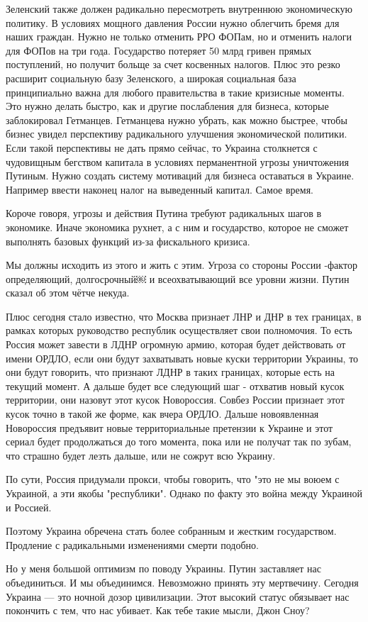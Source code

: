 Зеленский также должен радикально пересмотреть внутреннюю экономическую
политику. В условиях мощного давления России нужно облегчить бремя для наших
граждан. Нужно не только отменить РРО ФОПам, но и отменить налоги для ФОПов на
три года. Государство потеряет 50 млрд гривен прямых поступлений, но получит
больще за счет косвенных налогов. Плюс это резко расширит социальную базу
Зеленского, а широкая социальная база принципиально важна для любого
правительства в такие кризисные моменты. Это нужно делать быстро, как и другие
послабления для бизнеса, которые заблокировал Гетманцев. Гетманцева нужно
убрать, как можно быстрее, чтобы бизнес увидел перспективу радикального
улучшения экономической политики. Если такой перспективы не дать прямо сейчас,
то Украина столкнется с чудовищным бегством капитала в условиях перманентной
угрозы уничтожения Путиным. Нужно создать систему мотиваций для бизнеса
оставаться в Украине. Например ввести наконец налог на выведенный капитал.
Самое время.

Короче говоря, угрозы и действия Путина требуют радикальных шагов в экономике.
Иначе экономика рухнет, а с ним и государство, которое не сможет выполнять
базовых функций из-за фискального кризиса.

Мы должны исходить из этого и жить с этим. Угроза со стороны России -фактор
определяющий, долгосрочный￼ и всеохватывающий все уровни жизни. Путин сказал об
этом чётче некуда.

Плюс сегодня стало известно, что Москва признает ЛНР и ДНР в тех границах, в
рамках которых руководство республик осуществляет свои полномочия. То есть
Россия может завести в ЛДНР огромную армию, которая будет действовать от имени
ОРДЛО, если они будут захватывать новые куски территории Украины, то они будут
говорить, что признают ЛДНР в таких границах, которые есть на текущий момент. А
дальше будет все следующий шаг - отхватив новый кусок территории, они назовут
этот кусок Новороссия. Совбез России признает этот кусок точно в такой же
форме, как вчера ОРДЛО. Дальше новоявленная Новороссия предъявит новые
территориальные претензии к Украине и этот сериал будет продолжаться до того
момента, пока или не получат так по зубам, что страшно будет лезть дальше, или
не сожрут всю Украину.

По сути, Россия придумали прокси, чтобы говорить, что "это не мы воюем с
Украиной, а эти якобы "республики". Однако по факту это война между Украиной и
Россией.

Поэтому Украина обречена стать более собранным и жестким государством.
Продление с радикальными изменениями смерти подобно.

Но у меня большой оптимизм по поводу Украины. Путин заставляет нас
объединиться. И мы объединимся. Невозможно принять эту мертвечину. Сегодня
Украина — это ночной дозор цивилизации. Этот высокий статус обязывает нас
покончить с тем, что нас убивает. Как тебе такие мысли, Джон Сноу?
